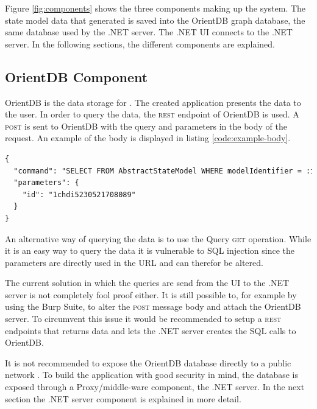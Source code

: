 Figure \ref{fig:components} shows the three components making up the system. The state model data that \testar generated is saved into the OrientDB graph database, the same database used by the .NET server. The .NET UI connects to the .NET server. In the following sections, the different components are explained. 


\subsection{OrientDB Component}
OrientDB is the data storage for \testar. The created application presents the data to the user. In order to query the data, the \textsc{rest} endpoint of OrientDB is used. A \textsc{post} is sent to OrientDB with the query and parameters in the body of the request. An example of the body is displayed in listing \ref{code:example-body}.

\begin{lstlisting}[language=xml, caption=Get AbstractStateModel by the model identifier, label=code:example-body]
{
  "command": "SELECT FROM AbstractStateModel WHERE modelIdentifier = :id",
  "parameters": {
    "id": "1chdi5230521708089"
  }
}
\end{lstlisting}

An alternative way of querying the data is to use the Query \textsc{get} operation. While it is an easy way to query the data it is vulnerable to SQL injection since the parameters are directly used in the URL and can therefor be altered.

The current solution in which the queries are send from the UI to the .NET server is not completely fool proof either. It is still possible to, for example by using the Burp Suite, to alter the \textsc{post} message body and attach the OrientDB server. To circumvent this issue it would be recommended to setup a \textsc{rest} endpoints that returns data and lets the .NET server creates the SQL calls to OrientDB. 

It is not recommended to expose the OrientDB database directly to a public network \cite{orientdb-security}. To build the application with good security in mind, the database is exposed through a Proxy/middle-ware component, the .NET server. In the next section the .NET server component is explained in more detail.

